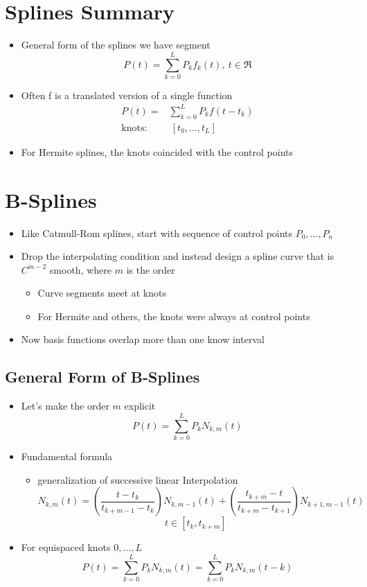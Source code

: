 \documentclass{article}
\begin{document}
\section*{Splines Summary}
\begin{itemize}
    \item General form of the splines we have segment
    \[P(t) = \sum_{k = 0}^L P_k f_k(t),\:t \in \Re\]
    \item Often f is a translated version of a single function
    \begin{align*}
        P(t) =& \sum_{k = 0}^L P_k f(t - t_k)\\
        \text{knots} :& \:[t_0, \dots, t_L]
    \end{align*}
    \item For Hermite splines, the knots coincided with the control points
\end{itemize}

\section*{B-Splines}
\begin{itemize}
    \item Like Catmull-Rom splines, start with sequence of control points $P_0, \dots, P_n$
    \item Drop the interpolating condition and instead design a spline curve that is $C^{m - 2}$ smooth, where $m$ is the order
    \begin{itemize}
        \item Curve segments meet at knots
        \item For Hermite and others, the knots were always at control points
    \end{itemize}
    \item Now basis functions overlap more than one know interval
\end{itemize}

\subsection*{General Form of B-Splines}
\begin{itemize}
    \item Let's make the order $m$ explicit
    \[P(t) = \sum_{k = 0}^L P_k N_{k, m}(t)\]
    \item Fundamental formula
    \begin{itemize}
        \item generalization of successive linear Interpolation
        \[N_{k, m}(t) = \left(\frac{t - t_k}{t_{k + m - 1} - t_k}\right) N_{k, m - 1}(t) + \left(\frac{t_{k + m} - t}{t_{k + m} - t_{k + 1}}\right)N_{k + 1, m - 1}(t)\]
        \[t \in [t_k, t_{k + m}]\]
    \end{itemize}
    \item For equispaced knots $0, \dots, L$
    \[P(t) = \sum_{k = 0}^L P_k N_{k, m}(t) = \sum_{k = 0}^L P_k N_{k, m} (t - k)\]
\end{itemize}
\end{document}
